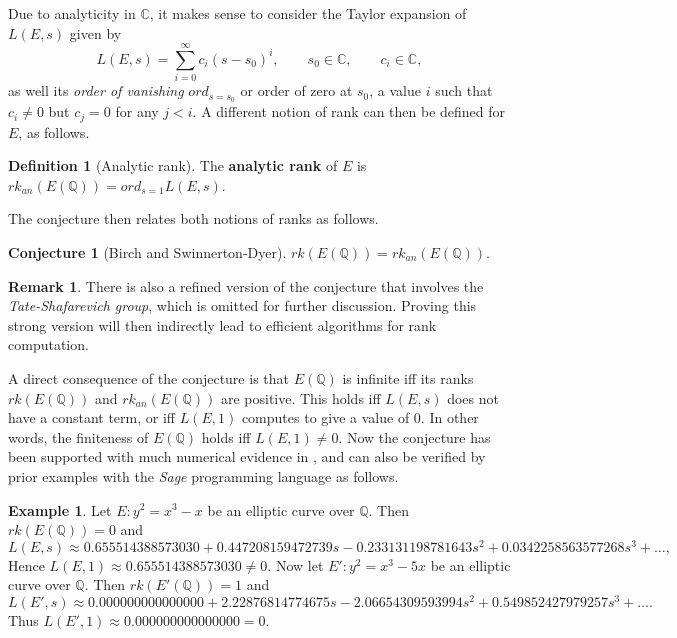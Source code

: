 \documentclass{article}
\newcommand{\Q}{\mathbb{Q}}
\newcommand{\C}{\mathbb{C}}
\newcommand{\rb}[1]{\left( #1 \right)}
\theoremstyle{definition}
\newtheorem*{definition}{Definition}
\newtheorem*{example}{Example}
\newtheorem*{remark}{Remark}
\newtheorem{conjecture}[proposition]{Conjecture}
\begin{document}
Due to analyticity in $ \C $, it makes sense to consider the Taylor expansion of $ L\rb{E, s} $ given by
$$ L\rb{E, s} = \sum_{i = 0}^\infty c_i\rb{s - s_0}^i, \qquad s_0 \in \C, \qquad c_i \in \C, $$
as well its \emph{order of vanishing} $ ord_{s = s_0} $ or order of zero at $ s_0 $, a value $ i $ such that $ c_i \ne 0 $ but $ c_j = 0 $ for any $ j < i $. A different notion of rank can then be defined for $ E $, as follows.

\begin{definition}[Analytic rank]
The \textbf{analytic rank} of $ E $ is $ rk_{an}\rb{E\rb{\Q}} = ord_{s = 1}L\rb{E, s} $.
\end{definition}

The conjecture then relates both notions of ranks as follows.

\begin{conjecture}[Birch and Swinnerton-Dyer] $ rk\rb{E\rb{\Q}} = rk_{an}\rb{E\rb{\Q}} $.
\end{conjecture}

\begin{remark}
There is also a refined version of the conjecture that involves the \emph{Tate-Shafarevich group}, which is omitted for further discussion. Proving this strong version will then indirectly lead to efficient algorithms for rank computation.
\end{remark}

A direct consequence of the conjecture is that $ E\rb{\Q} $ is infinite iff its ranks $ rk\rb{E\rb{\Q}} $ and $ rk_{an}\rb{E\rb{\Q}} $ are positive. This holds iff $ L\rb{E, s} $ does not have a constant term, or iff $ L\rb{E, 1} $ computes to give a value of $ 0 $. In other words, the finiteness of $ E\rb{\Q} $ holds iff $ L\rb{E, 1} \ne 0 $. Now the conjecture has been supported with much numerical evidence in \cite{bsd0}, and can also be verified by prior examples with the \emph{Sage} programming language as follows.

\begin{example}
Let $ E : y^2 = x^3 - x $ be an elliptic curve over $ \Q $. Then $ rk\rb{E\rb{\Q}} = 0 $ and
$$ L\rb{E, s} \approx 0.655514388573030 + 0.447208159472739s - 0.233131198781643s^2 + 0.0342258563577268s^3 + \dots, $$
Hence $ L\rb{E, 1} \approx 0.655514388573030 \ne 0 $. Now let $ E' : y^2 = x^3 - 5x $ be an elliptic curve over $ \Q $. Then $ rk\rb{E'\rb{\Q}} = 1 $ and
$$ L\rb{E', s} \approx 0.000000000000000 + 2.22876814774675s - 2.06654309593994s^2 + 0.549852427979257s^3 + \dots. $$
Thus $ L\rb{E', 1} \approx 0.000000000000000 = 0 $.
\end{example}
\end{document}
